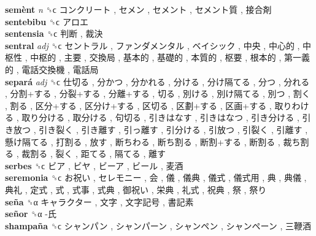 \textbf{semènt} \emph{n}  ␝ϲ   コンクリート ,  セメン ,  セメント ,  セメント質 ,  接合剤   \\
\textbf{sentebibu} ␝ϲ   アロエ   \\
\textbf{sentensia} ␝ϲ   判断 ,  裁決   \\
\textbf{sentral} \emph{adj}  ␝ϲ   セントラル ,  ファンダメンタル ,  ベイシック ,  中央 ,  中心的 ,  中枢性 ,  中枢的 ,  主要 ,  交換局 ,  基本的 ,  基礎的 ,  本質的 ,  枢要 ,  根本的 ,  第一義的 ,  電話交換機 ,  電話局   \\
\textbf{separá} \emph{adj}  ␝ϲ   仕切る ,  分かつ ,  分かれる ,  分ける ,  分け隔てる ,  分つ ,  分れる ,  分割+する ,  分裂+する ,  分離+する ,  切る ,  別ける ,  別け隔てる ,  別つ ,  割く ,  割る ,  区分+する ,  区分け+する ,  区切る ,  区劃+する ,  区画+する ,  取りわける ,  取り分ける ,  取分ける ,  句切る ,  引きはなす ,  引きはなつ ,  引き分ける ,  引き放つ ,  引き裂く ,  引き離す ,  引っ離す ,  引分ける ,  引放つ ,  引裂く ,  引離す ,  懸け隔てる ,  打割る ,  放す ,  断ちわる ,  断ち割る ,  断割+する ,  断割る ,  裁ち割る ,  裁割る ,  裂く ,  距てる ,  隔てる ,  離す   \\
\textbf{serbes} ␝ϲ   ビア ,  ビヤ ,  ビーア ,  ビール ,  麦酒   \\
\textbf{seremonia} ␝ϲ   お祝い ,  セレモニー ,  会 ,  儀 ,  儀典 ,  儀式 ,  儀式用 ,  典 ,  典儀 ,  典礼 ,  定式 ,  式 ,  式事 ,  式典 ,  御祝い ,  栄典 ,  礼式 ,  祝典 ,  祭 ,  祭り   \\
\textbf{seña} ␝α   キャラクター ,  文字 ,  文字記号 ,  書記素   \\
\textbf{señor} ␝α   -氏   \\
\textbf{shampaña} ␝ϲ   シャンパン ,  シャンパーン ,  シャンペン ,  シャンペーン ,  三鞭酒   \\
